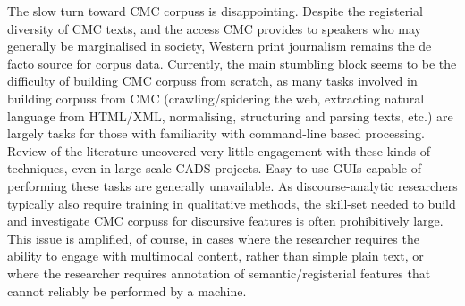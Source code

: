 The slow turn toward \gls{CMC} \glspl{corpus} is disappointing. Despite the registerial diversity of \gls{CMC} texts, and the access \gls{CMC} provides to speakers who may generally be marginalised in society, Western print journalism remains the de facto source for \gls{corpus} data. Currently, the main stumbling block seems to be the difficulty of building \gls{CMC} \glspl{corpus} from scratch, as many tasks involved in building \glspl{corpus} from \gls{CMC} (crawling\slash spidering the web, extracting natural language from \gls{HTML}\slash \gls{XML}, normalising, structuring and parsing texts, etc.) are largely tasks for those with familiarity with command\hyp{}line based processing. Review of the literature uncovered very little engagement with these kinds of techniques, even in large\hyp{}scale \gls{CADS} projects. Easy\hyp{}to\hyp{}use \glspl{GUI} capable of performing these tasks are generally unavailable. As discourse\hyp{}analytic researchers typically also require training in qualitative methods, the skill\hyp{}set needed to build and investigate \gls{CMC} \glspl{corpus} for discursive features is often prohibitively large. This issue is amplified, of course, in cases where the researcher requires the ability to engage with multimodal content, rather than simple plain text, or where the researcher requires annotation of semantic\slash registerial features that cannot reliably be performed by a machine.



